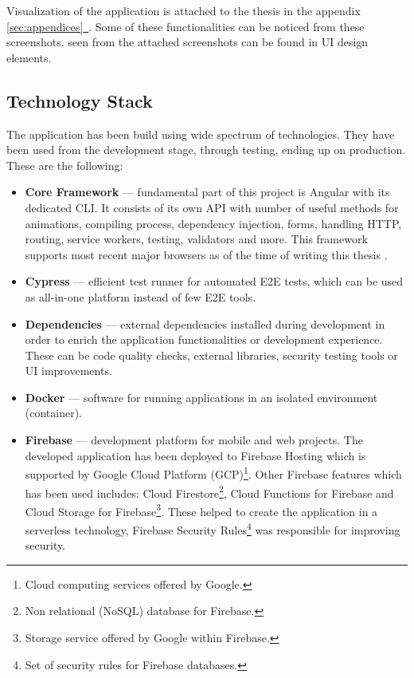 \documentclass{article} %
\newcommand{\fullref}[1]{\hyperref[#1]{\ref*{#1}\ \nameref*{#1}}}
\begin{document}
Visualization of the application is attached to the thesis in the appendix \fullref{sec:appendices}. Some of these functionalities can be noticed from these screenshots. seen from the attached screenshots can be found in UI design elements.
\subsection{Technology Stack}
The application has been build using wide spectrum of technologies. They have been used from the development stage, through testing, ending up on production. These are the following:
\begin{itemize}
    \item \textbf{Core Framework} --- fundamental part of this project is Angular with its dedicated CLI. It consists of its own API with number of useful methods for animations, compiling process, dependency injection, forms, handling HTTP, routing, service workers, testing, validators and more. This framework supports most recent major browsers as of the time of writing this thesis \cite{bib:angular_browser_support}.
    \item \textbf{Cypress } --- efficient test runner for automated E2E tests, which can be used as all-in-one platform instead of few E2E tools.
    \item \textbf{Dependencies} ---  external dependencies installed during development in order to enrich the application functionalities or development experience. These can be code quality checks, external libraries, security testing tools or UI improvements.
    \item \textbf{Docker} --- software for running applications in an isolated environment (container).
    \item \textbf{Firebase} --- development platform for mobile and web projects. The developed application has been deployed to Firebase Hosting which is supported by Google Cloud Platform (GCP)\footnote{Cloud computing services offered by Google.}. Other Firebase features which has been used includes: Cloud Firestore\footnote{Non relational (NoSQL) database for Firebase.}, Cloud Functions for Firebase and Cloud Storage for Firebase\footnote{Storage service offered by Google within Firebase.}. These helped to create the application in a serverless technology, Firebase Security Rules\footnote{Set of security rules for Firebase databases.} was responsible for improving security.

\end{itemize}
\end{document}
